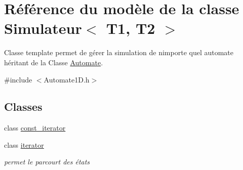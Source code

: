 \hypertarget{class_simulateur}{}\section{Référence du modèle de la classe Simulateur$<$ T1, T2 $>$}
\label{class_simulateur}


Classe template permet de gérer la simulation de n\textquotesingle{}importe quel automate héritant de la Classe \hyperlink{class_automate}{Automate}.  




{\ttfamily \#include $<$Automate1\+D.\+h$>$}

\subsection*{Classes}
\begin{DoxyCompactItemize}
\item 
class \hyperlink{class_simulateur_1_1const__iterator}{const\+\_\+iterator}
\item 
class \hyperlink{class_simulateur_1_1iterator}{iterator}
\begin{DoxyCompactList}\small\item\em permet le parcourt des états \end{DoxyCompactList}\end{DoxyCompactItemize}
